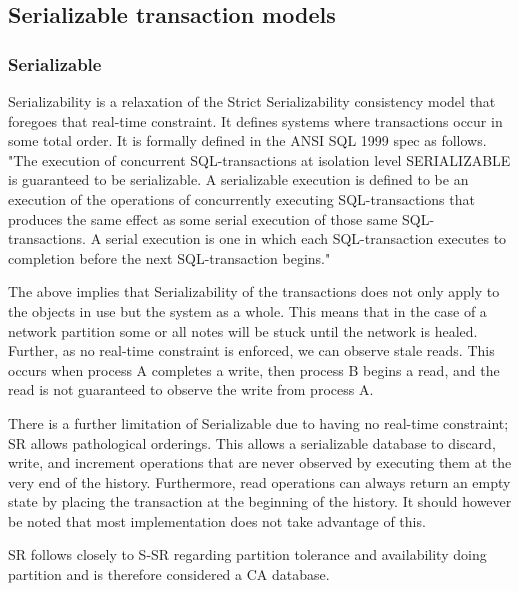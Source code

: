 \documentclass[a4paper,10pt,titlepage]{report}
\begin{document}
    \subsection{Serializable transaction models}

    \subsubsection{Serializable}

    Serializability is a relaxation of the Strict Serializability consistency model that foregoes that real-time constraint. It defines systems where transactions occur in some total order. It is formally defined in the ANSI SQL 1999 spec as follows. "The execution of concurrent SQL-transactions at isolation level SERIALIZABLE is guaranteed to be serializable. A serializable execution is defined to be an execution of the operations of concurrently executing SQL-transactions that produces the same effect as some serial execution of those same SQL-transactions. A serial execution is one in which each SQL-transaction executes to completion before the next SQL-transaction begins." \cite{ansisql1999}\\
    \vspace{5mm}

    The above implies that Serializability of the transactions does not only apply to the objects in use but the system as a whole. This means that in the case of a network partition some or all notes will be stuck until the network is healed. Further, as no real-time constraint is enforced,  we can observe stale reads. This occurs when process A completes a write, then process B begins a read, and the read is not guaranteed to observe the write from process A.

    There is a further limitation of Serializable due to having no real-time constraint; SR allows pathological orderings. This allows a serializable database to discard, write, and increment operations that are never observed by executing them at the very end of the history. Furthermore, read operations can always return an empty state by placing the transaction at the beginning of the history. It should however be noted that most implementation does not take advantage of this.

    SR follows closely to S-SR regarding partition tolerance and availability doing partition and is therefore considered a CA database.
\end{document}
